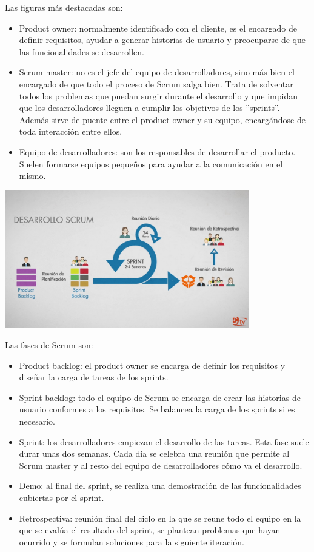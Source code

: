 Las figuras más destacadas son:
\begin{itemize}
	\item Product owner: normalmente identificado con el cliente, es el encargado de definir requisitos, ayudar a generar historias de usuario y preocuparse de que las funcionalidades se desarrollen.
	\item Scrum master: no es el jefe del equipo de desarrolladores, sino más bien el encargado de que todo el proceso de Scrum salga bien. Trata de solventar todos los problemas que puedan surgir durante el desarrollo y que impidan que los desarrolladores lleguen a cumplir los objetivos de los ''sprints''. Además sirve de puente entre el product owner y su equipo, encargándose de toda interacción entre ellos.
	\item Equipo de desarrolladores: son los responsables de desarrollar el producto. Suelen formarse equipos pequeños para ayudar a la comunicación en el mismo.
\end{itemize}

\begin{center}
	\includegraphics[width=0.8\textwidth]{include/scrumPhases.jpg}
\end{center}

Las fases de Scrum son:
\begin{itemize}
	\item Product backlog: el product owner se encarga de definir los requisitos y diseñar la carga de tareas de los sprints.
	\item Sprint backlog: todo el equipo de Scrum se encarga de crear las historias de usuario conformes a los requisitos. Se balancea la carga de los sprints si es necesario.
	\item Sprint: los desarrolladores empiezan el desarrollo de las tareas. Esta fase suele durar unas dos semanas. Cada día se celebra una reunión que permite al Scrum master y al resto del equipo de desarrolladores cómo va el desarrollo.
	\item Demo: al final del sprint, se realiza una demostración de las funcionalidades cubiertas por el sprint.
	\item Retrospectiva: reunión final del ciclo en la que se reune todo el equipo en la que se evalúa el resultado del sprint, se plantean problemas que hayan ocurrido y se formulan soluciones para la siguiente iteración.
\end{itemize}


